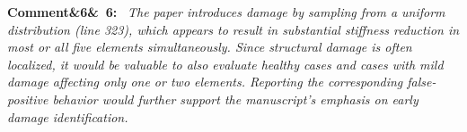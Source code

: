 \documentclass[11pt]{article}
\newenvironment{rcomment}[1]{\par\bigskip\noindent\textbf{Comment\ifx&#1&\else\ #1\fi:}\ \itshape}{\par}
\newcommand{\z}{\mathbf{z}}
\begin{document}
 

\begin{rcomment}{6}
The paper introduces damage by sampling from a uniform distribution (line 323), which appears to result in substantial
stiffness reduction in most or all five elements simultaneously. Since structural damage is often localized, it would be
valuable to also evaluate healthy cases and cases with mild damage affecting only one or two elements. Reporting the
corresponding false-positive behavior would further support the manuscript's emphasis on early damage identification.
\end{rcomment}
\end{document}
